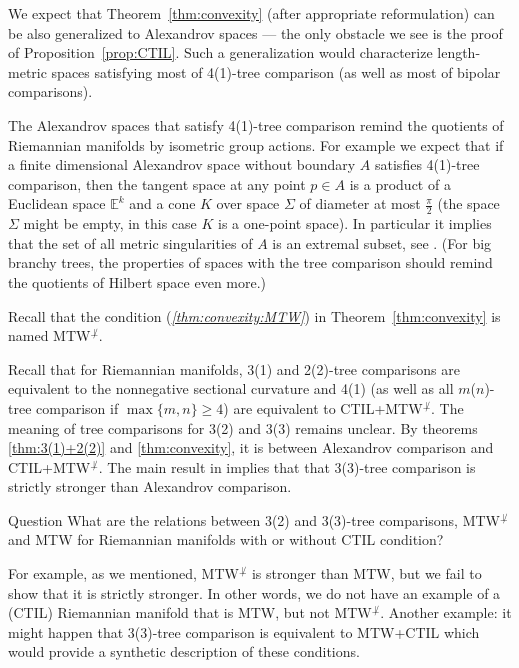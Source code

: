 We expect that Theorem~\ref{thm:convexity} (after appropriate reformulation) can be also generalized to Alexandrov spaces --- the only obstacle we see is the proof of Proposition~\ref{prop:CTIL}.
Such a generalization would characterize length-metric spaces satisfying most of 4(1)-tree comparison (as well as most of bipolar comparisons).

The Alexandrov spaces that satisfy 4(1)-tree comparison remind the quotients of Riemannian manifolds by isometric group actions. 
For example we expect that if a finite dimensional Alexandrov space without boundary $A$ satisfies 4(1)-tree comparison, then the tangent space at any point $p\in A$ is a product of a Euclidean space $\mathbb{E}^k$ and a cone $K$ over space $\Sigma$ of diameter at most $\tfrac\pi2$ (the space $\Sigma$ might be empty, in this case $K$ is a one-point space).
In particular it implies that the set of all metric singularities of $A$ is an extremal subset, see \cite{perelman-petrunin}.
(For big branchy trees, the properties of spaces with the tree comparison should remind the quotients of Hilbert space even more.)

Recall that the condition (\textit{\ref{thm:convexity:MTW}}) in Theorem~\ref{thm:convexity} is named MTW$^{\not\perp}$.

Recall that for Riemannian manifolds, 3(1) and 2(2)-tree comparisons are equivalent to the nonnegative sectional curvature and 4(1) (as well as all $m$($n$)-tree comparison if $\max\{m,n\}\ge 4$) are equivalent to CTIL+MTW$^{\not\perp}$.
The meaning of tree comparisons for 3(2) and 3(3) remains unclear.
By theorems \ref{thm:3(1)+2(2)} and \ref{thm:convexity}, it is between Alexandrov comparison and CTIL+MTW$^{\not\perp}$.
The main result in \cite{lebedeva} implies that that 3(3)-tree comparison is strictly stronger than Alexandrov comparison.

\begin{thm}{Question}
What are the relations between 3(2) and 3(3)-tree comparisons,  MTW$^{\not\perp}$ and MTW for Riemannian manifolds with or without CTIL condition?
\end{thm}

For example, as we mentioned, MTW$^{\not\perp}$ is stronger than MTW, but we fail to show that it is strictly stronger.
In other words, we do not have an example of a (CTIL) Riemannian manifold that is MTW, but not MTW$^{\not\perp}$.
Another example: it might happen that 3(3)-tree comparison is equivalent to MTW+CTIL which would provide a synthetic description of these conditions.

